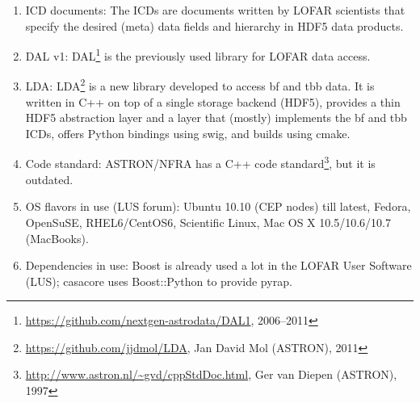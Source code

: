 \documentclass[a4paper,11pt]{article}
\begin{document}
\begin{enumerate}[label=\it E.\arabic{*}]
There is an issue with accessing data sets in external files: HDF5 opens these files relative to the current working directory (as opposed to the location of the HDF5 file opened).
This issue has been reported to the HDF Group.

HDF5 can have data integrity/loss issues if the user program crashes, especially if chunked storage is used.
In August 2012, an HDF Group developer wrote on their mailing list about two new features to improve data integrity (among them, journaling), to be included in version 1.10 which is planned to be released at the end of 2012.

The HDF Group is investigating if/how to add support for an XML based data specification format (1.10?).
This can be useful, because frequently, the structure of HDF5 files comes back in different places in a tool or library (e.g. various documents, get/set code, compliance check table, etc), so then those could be generated from one XML representation.

\item \label{env:ICDs} ICD documents: The ICDs are documents written by LOFAR scientists that specify the desired (meta) data fields and hierarchy in HDF5 data products.

\item \label{env:DAL} DAL v1: DAL\footnote{\url{https://github.com/nextgen-astrodata/DAL1}, 2006--2011} is the previously used library for LOFAR data access.

\item \label{env:LDA} LDA: LDA\footnote{\url{https://github.com/jjdmol/LDA}, Jan David Mol (ASTRON), 2011} is a new library developed to access bf and tbb data.
It is written in C++ on top of a single storage backend (HDF5), provides a thin HDF5 abstraction layer and a layer that (mostly) implements the bf and tbb ICDs, offers Python bindings using swig, and builds using cmake.

\item \label{env:code_std} Code standard: ASTRON/NFRA has a C++ code standard\footnote{\url{http://www.astron.nl/~gvd/cppStdDoc.html}, Ger van Diepen (ASTRON), 1997}, but it is outdated.

\item \label{env:OSes_used} OS flavors in use (LUS forum): Ubuntu 10.10 (CEP nodes) till latest, Fedora, OpenSuSE, RHEL6/CentOS6, Scientific Linux, Mac OS X 10.5/10.6/10.7 (MacBooks).

\item \label{env:deps_in_use} Dependencies in use: Boost is already used a lot in the LOFAR User Software (LUS); casacore uses Boost::Python to provide pyrap.


\end{enumerate}
\end{document}
